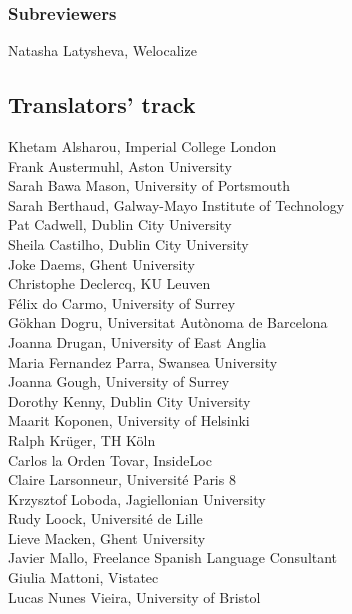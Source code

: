 \documentclass[a4paper,11pt,twoside]{book}
\begin{document}
\subsubsection*{Subreviewers}
\noindent Natasha Latysheva, Welocalize

\clearpage

\subsection*{Translators' track}
\noindent Khetam Alsharou, Imperial College London\\
\noindent Frank Austermuhl, Aston University\\
\noindent Sarah Bawa Mason, University of Portsmouth\\
\noindent Sarah Berthaud, Galway-Mayo Institute of Technology\\
\noindent Pat Cadwell, Dublin City University\\
\noindent Sheila Castilho, Dublin City University\\
\noindent Joke Daems, Ghent University\\
\noindent Christophe Declercq, KU Leuven\\
\noindent Félix do Carmo, University of Surrey\\
\noindent Gökhan Dogru, Universitat Autònoma de Barcelona\\
\noindent Joanna Drugan, University of East Anglia\\
\noindent Maria Fernandez Parra, Swansea University\\
\noindent Joanna Gough, University of Surrey\\
\noindent Dorothy Kenny, Dublin City University\\
\noindent Maarit Koponen, University of Helsinki\\
\noindent Ralph Krüger, TH Köln\\
\noindent Carlos la Orden Tovar, InsideLoc\\
\noindent Claire Larsonneur, Université Paris 8\\
\noindent Krzysztof Loboda, Jagiellonian University\\
\noindent Rudy Loock, Université de Lille\\
\noindent Lieve Macken, Ghent University\\
\noindent Javier Mallo, Freelance Spanish Language Consultant\\
\noindent Giulia Mattoni, Vistatec\\
\noindent Lucas Nunes Vieira, University of Bristol\\
\end{document}
